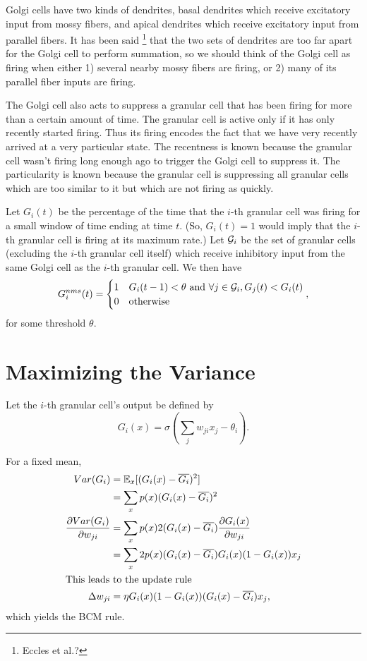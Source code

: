 \documentclass{article}
\theoremstyle{definition}
\begin{document}
Golgi cells have two kinds of dendrites, basal dendrites which receive
excitatory input from mossy fibers, and apical dendrites which receive
excitatory input from parallel fibers. It has been said \footnote{Eccles et
  al.?}  that the two sets of dendrites are too far apart for the
Golgi cell to perform summation, so we should think of the Golgi cell
as firing when either 1) several nearby mossy fibers are firing, or 2)
many of its parallel fiber inputs are firing.

The Golgi cell also acts to suppress a granular cell that has been
firing for more than a certain amount of time. The granular cell is
active only if it has only recently started firing. Thus its firing
encodes the fact that we have very recently arrived at a very
particular state. The recentness is known because the granular cell
wasn't firing long enough ago to trigger the Golgi cell to suppress
it. The particularity is known because the granular cell is
suppressing all granular cells which are too similar to it but which
are not firing as quickly.

Let $G_i(t)$ be the percentage of the time that the $i$-th granular
cell was firing for a small window of time ending at time $t$. (So,
$G_i(t)=1$ would imply that the $i$-th granular cell is firing at its
maximum rate.) Let ${\mathcal G}_i$ be the set of granular cells (excluding
the $i$-th granular cell itself) which receive inhibitory input from
the same Golgi cell as the $i$-th granular cell.  We then have
$$G_i^{nms}(t) = \begin{cases}
1 & G_i(t-1) < \theta \mbox{ and } \forall j\in {\mathcal G}_i, G_j(t) < G_i(t)\\
0 & \mbox{otherwise}
\end{cases}, $$
for some threshold $\theta$.

\section{Maximizing the Variance}

Let the $i$-th granular cell's output be defined by
$$G_i(x) = \sigma\left( \sum_j w_{ji} x_j - \theta_i \right).$$

For a fixed mean,
\begin{align*}
Var(G_i) &= \mathbb{E}_x [ (G_i(x) - \overline{G_i})^2 ] \\
&= \sum_x p(x) (G_i(x) - \overline{G_i})^2 \\
\frac{\partial Var(G_i)}{\partial w_{ji}} &= \sum_x p(x) 2 (G_i(x) - \overline{G_i}) \frac{\partial G_i(x)}{\partial{w_{ji}}}\\
&= \sum_x 2 p(x) (G_i(x) - \overline{G_i}) G_i(x) (1-G_i(x)) x_j\\
\intertext{This leads to the update rule}
\Delta w_{ji} &= \eta G_i(x) (1-G_i(x)) (G_i(x) - \overline{G_i}) x_j,\\
\end{align*}
which yields the BCM rule.
\end{document}
